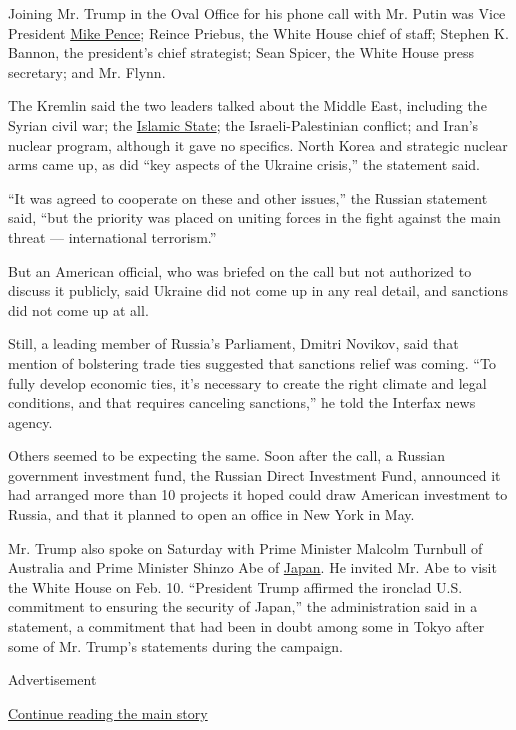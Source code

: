 Joining Mr. Trump in the Oval Office for his phone call with Mr. Putin
was Vice President
\href{http://topics.nytimes.com/top/reference/timestopics/people/p/mike_pence/index.html}{Mike
Pence}; Reince Priebus, the White House chief of staff; Stephen K.
Bannon, the president's chief strategist; Sean Spicer, the White House
press secretary; and Mr. Flynn.

The Kremlin said the two leaders talked about the Middle East, including
the Syrian civil war; the
\href{https://www.nytimes.com/topic/organization/islamic-state}{Islamic
State}; the Israeli-Palestinian conflict; and Iran's nuclear program,
although it gave no specifics. North Korea and strategic nuclear arms
came up, as did ``key aspects of the Ukraine crisis,'' the statement
said.

``It was agreed to cooperate on these and other issues,'' the Russian
statement said, ``but the priority was placed on uniting forces in the
fight against the main threat --- international terrorism.''

But an American official, who was briefed on the call but not authorized
to discuss it publicly, said Ukraine did not come up in any real detail,
and sanctions did not come up at all.

Still, a leading member of Russia's Parliament, Dmitri Novikov, said
that mention of bolstering trade ties suggested that sanctions relief
was coming. ``To fully develop economic ties, it's necessary to create
the right climate and legal conditions, and that requires canceling
sanctions,'' he told the Interfax news agency.

Others seemed to be expecting the same. Soon after the call, a Russian
government investment fund, the Russian Direct Investment Fund,
announced it had arranged more than 10 projects it hoped could draw
American investment to Russia, and that it planned to open an office in
New York in May.

Mr. Trump also spoke on Saturday with Prime Minister Malcolm Turnbull of
Australia and Prime Minister Shinzo Abe of
\href{https://www.nytimes.com/topic/destination/japan}{Japan}. He
invited Mr. Abe to visit the White House on Feb. 10. ``President Trump
affirmed the ironclad U.S. commitment to ensuring the security of
Japan,'' the administration said in a statement, a commitment that had
been in doubt among some in Tokyo after some of Mr. Trump's statements
during the campaign.

Advertisement

\protect\hyperlink{after-bottom}{Continue reading the main story}

